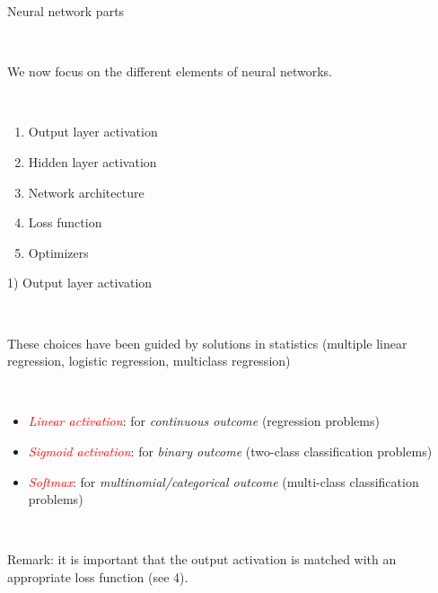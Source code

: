 \documentclass[10pt,ignorenonframetext,]{beamer}
\providecommand{\tightlist}{%
  \setlength{\itemsep}{0pt}\setlength{\parskip}{0pt}}
\begin{document}
\begin{frame}{Neural network parts}
\protect\hypertarget{neural-network-parts}{}

\(~\)

We now focus on the different elements of neural networks.

\(~\)

\begin{enumerate}
[1)]
\tightlist
\item
  Output layer activation
\item
  Hidden layer activation
\item
  Network architecture
\item
  Loss function
\item
  Optimizers
\end{enumerate}

\end{frame}

\begin{frame}

\begin{block}{1) Output layer activation}

\(~\)

These choices have been guided by solutions in statistics (multiple
linear regression, logistic regression, multiclass regression)

\(~\)

\begin{itemize}
\item
  \emph{\textcolor{red}{Linear activation}}: for \emph{continuous
  outcome} (regression problems) \vspace{2mm}
\item
  \emph{\textcolor{red}{Sigmoid activation}}: for \emph{binary outcome}
  (two-class classification problems) \vspace{2mm}
\item
  \emph{\textcolor{red}{Softmax}}: for \emph{multinomial/categorical
  outcome} (multi-class classification problems)
\end{itemize}

\(~\)

Remark: it is important that the output activation is matched with an
appropriate loss function (see 4).

\end{block}

\end{frame}
\end{document}
